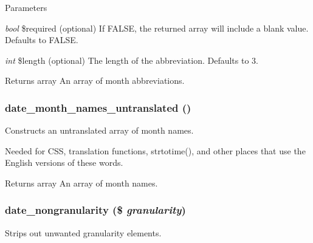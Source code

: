 \begin{DoxyParams}{Parameters}
\item[{\em bool}]\$required (optional) If FALSE, the returned array will include a blank value. Defaults to FALSE. \item[{\em int}]\$length (optional) The length of the abbreviation. Defaults to 3.\end{DoxyParams}
\begin{DoxyReturn}{Returns}
array An array of month abbreviations. 
\end{DoxyReturn}
\hypertarget{date__api_8module_a8203e4af78f056ba126604d32b17f49b}{
\subsubsection[{date\_\-month\_\-names\_\-untranslated}]{\setlength{\rightskip}{0pt plus 5cm}date\_\-month\_\-names\_\-untranslated ()}}
\label{date__api_8module_a8203e4af78f056ba126604d32b17f49b}
Constructs an untranslated array of month names.

Needed for CSS, translation functions, strtotime(), and other places that use the English versions of these words.

\begin{DoxyReturn}{Returns}
array An array of month names. 
\end{DoxyReturn}
\hypertarget{date__api_8module_a3ab0befc8508e23ad18062b5a6f8b84b}{
\subsubsection[{date\_\-nongranularity}]{\setlength{\rightskip}{0pt plus 5cm}date\_\-nongranularity (\$ {\em granularity})}}
\label{date__api_8module_a3ab0befc8508e23ad18062b5a6f8b84b}
Strips out unwanted granularity elements.


